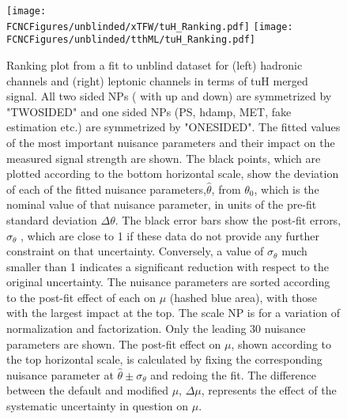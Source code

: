 \begin{figure}[htb]
\centering
\texttt{[image: \\FCNCFigures/unblinded/xTFW/tuH\_Ranking.pdf]}
\texttt{[image: \\FCNCFigures/unblinded/tthML/tuH\_Ranking.pdf]}
\caption{ Ranking plot from a fit to unblind dataset for (left) hadronic channels and (right)
leptonic channels in terms of tuH merged signal. All two sided NPs ( with up and down) are symmetrized by "TWOSIDED" and one sided NPs (PS, hdamp, MET, fake estimation etc.) are symmetrized by "ONESIDED". The fitted values of the most important nuisance parameters and their impact on the measured
signal strength are shown. The black points, which are plotted according to the bottom horizontal scale, show the deviation
of each of the fitted nuisance parameters,$\hat{\theta}$, from $\theta_{0}$, which is the nominal value of that nuisance parameter, in units of the
pre-fit standard deviation $\Delta\theta$. The black error bars show the post-fit errors, $\sigma_{\theta}$ , which are close to 1 if these data do not
provide any further constraint on that uncertainty. Conversely, a value of $\sigma_{\theta}$ much smaller than 1 indicates a significant
reduction with respect to the original uncertainty. The nuisance parameters are sorted according to the post-fit effect of each on $\mu$ (hashed blue area),
with those with the largest impact at the top. The scale NP is for a variation of normalization and factorization. Only the leading 30 nuisance parameters are shown. The post-fit effect on $\mu$,
shown according to the top horizontal scale, is calculated by fixing the corresponding nuisance parameter at $\hat{\theta}\pm \sigma_{\theta}$ and
redoing the fit. The difference between the default and modified $\mu$, $\Delta\mu$, represents the effect of the systematic uncertainty
in question on $\mu$.}
\label{fig:fcnc_rank_data}
\end{figure}

